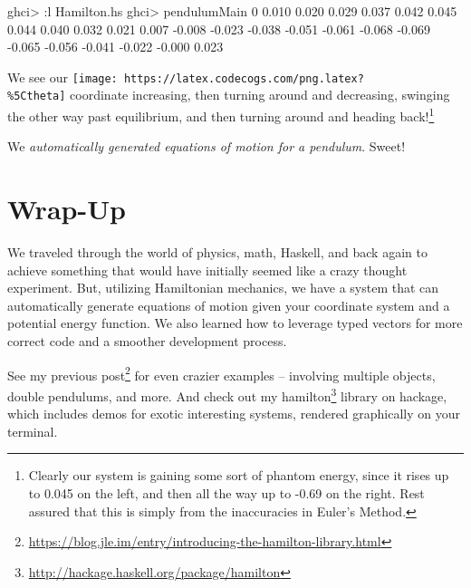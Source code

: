 \documentclass[]{article}
\newenvironment{Shaded}{}{}
\newcommand{\DecValTok}[1]{\textcolor[rgb]{0.25,0.63,0.44}{#1}}
\newcommand{\FloatTok}[1]{\textcolor[rgb]{0.25,0.63,0.44}{#1}}
\newcommand{\FunctionTok}[1]{\textcolor[rgb]{0.02,0.16,0.49}{#1}}
\newcommand{\NormalTok}[1]{#1}
\renewcommand{\href}[2]{#2\footnote{\url{#1}}}
\begin{document}
\begin{Shaded}
\begin{Highlighting}[]
\NormalTok{ghci}\FunctionTok{>} \FunctionTok{:}\NormalTok{l Hamilton.hs}
\NormalTok{ghci}\FunctionTok{>}\NormalTok{ pendulumMain}
\DecValTok{0}
\FloatTok{0.010}
\FloatTok{0.020}
\FloatTok{0.029}
\FloatTok{0.037}
\FloatTok{0.042}
\FloatTok{0.045}
\FloatTok{0.044}
\FloatTok{0.040}
\FloatTok{0.032}
\FloatTok{0.021}
\FloatTok{0.007}
\FunctionTok{-}\FloatTok{0.008}
\FunctionTok{-}\FloatTok{0.023}
\FunctionTok{-}\FloatTok{0.038}
\FunctionTok{-}\FloatTok{0.051}
\FunctionTok{-}\FloatTok{0.061}
\FunctionTok{-}\FloatTok{0.068}
\FunctionTok{-}\FloatTok{0.069}
\FunctionTok{-}\FloatTok{0.065}
\FunctionTok{-}\FloatTok{0.056}
\FunctionTok{-}\FloatTok{0.041}
\FunctionTok{-}\FloatTok{0.022}
\FunctionTok{-}\FloatTok{0.000}
\FloatTok{0.023}
\end{Highlighting}
\end{Shaded}

We see our \texttt{[image: https://latex.codecogs.com/png.latex?\\\%5Ctheta]}
coordinate increasing, then turning around and decreasing, swinging the other
way past equilibrium, and then turning around and heading back!\footnote{Clearly
  our system is gaining some sort of phantom energy, since it rises up to 0.045
  on the left, and then all the way up to -0.69 on the right. Rest assured that
  this is simply from the inaccuracies in Euler's Method.}

We \emph{automatically generated equations of motion for a pendulum}. Sweet!

\hypertarget{wrap-up}{%
\section{Wrap-Up}\label{wrap-up}}

We traveled through the world of physics, math, Haskell, and back again to
achieve something that would have initially seemed like a crazy thought
experiment. But, utilizing Hamiltonian mechanics, we have a system that can
automatically generate equations of motion given your coordinate system and a
potential energy function. We also learned how to leverage typed vectors for
more correct code and a smoother development process.

See my
\href{https://blog.jle.im/entry/introducing-the-hamilton-library.html}{previous
post} for even crazier examples -- involving multiple objects, double pendulums,
and more. And check out my
\href{http://hackage.haskell.org/package/hamilton}{hamilton} library on hackage,
which includes demos for exotic interesting systems, rendered graphically on
your terminal.
\end{document}
